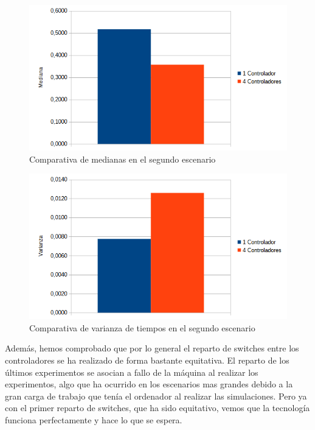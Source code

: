 \documentclass[a4paper, 12pt]{book}
\begin{document}
 	\begin{figure}[H]
 		\centering
 		\includegraphics[width=12cm, keepaspectratio]{img/comparativamedianamesh}
 		\caption{Comparativa de medianas en el segundo escenario}
 		\label{figura:medianamesh}
 	\end{figure}
 	
 	\begin{figure}[H]
 		\centering
 		\includegraphics[width=12cm, keepaspectratio]{img/comparativavarianzamesh}
 		\caption{Comparativa de varianza de tiempos en el segundo escenario}
 		\label{figura:varianzamesh}
 	\end{figure}
 	
 	\vspace{10pt} 
 	
 	Además, hemos comprobado que por lo general el reparto de switches entre los controladores se ha realizado de forma bastante equitativa. El reparto de los últimos experimentos se asocian a fallo de la máquina al realizar los experimentos, algo que ha ocurrido en los escenarios mas grandes debido a la gran carga de trabajo que tenía el ordenador al realizar las simulaciones. Pero ya con el primer reparto de switches, que ha sido equitativo, vemos que la tecnología funciona perfectamente y hace lo que se espera.
 	
\end{document}
